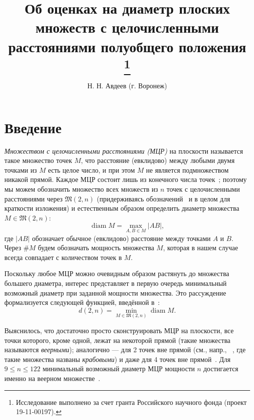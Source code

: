 \documentclass[11pt,twoside,draft
]{article}
\title
{%
Об оценках на диаметр плоских множеств с целочисленными расстояниями полуобщего положения%
\footnote{Исследование выполнено за счет гранта Российского научного фонда (проект 19-11-00197).}}
{%
On diameter bounds for planar integral point sets in semi-general position}
\author
{%
Н. Н. Авдеев (г. Воронеж)}
{%
N. N. Avdeev (Voronezh)}
\begin{document}
\maketitle

\enmaketitle



\section{Введение}



\textit{Множеством с целочисленными расстояниями (МЦР)} на плоскости
называется такое множество точек $M$, что расстояние (евклидово) между любыми двумя точками из $M$
есть целое число, и при этом $M$ не является подмножеством никакой прямой.
Каждое МЦР состоит лишь из конечного числа точек~\cite{anning1945integral,erdos1945integral};
поэтому мы можем обозначить множество всех множеств из $n$ точек с целочисленными расстояниями через
$\mathfrak{M}(2,n)$ (придерживаясь обозначений~\cite{our-vmmsh-2018} и в целом для краткости изложения)
и естественным образом определить диаметр множества $M\in\mathfrak{M}(2,n)$:
\begin{equation}
	\operatorname{diam} M = \max_{A,B\in M} |AB|
	,
\end{equation}
где $|AB|$ обозначает обычное (евклидово) расстояние между точками $A$ и $B$.
Через $\# M$ будем обозначать мощность множества $M$, которая в нашем случае всегда совпадает с количеством точек в $M$.

Поскольку любое МЦР можно очевидным образом растянуть
до множества большего диаметра,
интерес представляет в первую очередь минимальный возможный диаметр при заданной мощности множества.
Это рассуждение формализуется следующей функцией, введённой в~\cite{kurz2008bounds,kurz2008minimum}:
\begin{equation}
	d(2,n) = \min_{M\in\mathfrak{M}(2,n)} \operatorname{diam} M
	.
\end{equation}

Выяснилось, что достаточно просто сконструировать МЦР на плоскости,
все точки которого, кроме одной, лежат на некоторой прямой
(такие множества называются \textit{веерными});
аналогично --- для 2 точек вне прямой (см., напр., ~\cite{antonov2008maximal}, где такие множества названы \textit{крабовыми})
и даже для 4 точек вне прямой~\cite{huff1948diophantine}.
Для $9\leq n\leq 122$ минимальный возможный диаметр МЦР мощности $n$ достигается именно на веерном множестве~\cite{kurz2008bounds}.
\end{document}
